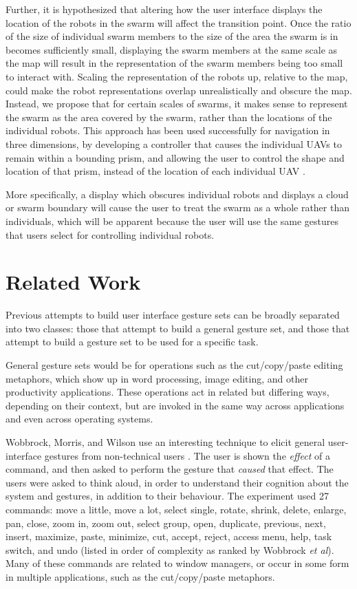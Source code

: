 \documentclass[]{article}
\begin{document}
Further, it is hypothesized that altering how the user interface displays the location of the robots in the swarm will affect the transition point.
Once the ratio of the size of individual swarm members to the size of the area the swarm is in becomes sufficiently small, displaying the swarm members at the same scale as the map will result in the representation of the swarm members being too small to interact with. 
Scaling the representation of the robots up, relative to the map, could make the robot representations overlap unrealistically and obscure the map. 
Instead, we propose that for certain scales of swarms, it makes sense to represent the swarm as the area covered by the swarm, rather than the locations of the individual robots.
This approach has been used successfully for navigation in three dimensions, by developing a controller that causes the individual UAVs to remain within a bounding prism, and allowing the user to control the shape and location of that prism, instead of the location of each individual UAV \cite{ayanian2014controlling}.
 
More specifically, a display which obscures individual robots and displays a cloud or swarm boundary will cause the user to treat the swarm as a whole rather than individuals, which will be apparent because the user will use the same gestures that users select for controlling individual robots. 

\section{Related Work}

Previous attempts to build user interface gesture sets can be broadly separated into two classes: those that attempt to build a general gesture set, and those that attempt to build a gesture set to be used for a specific task. 

General gesture sets would be for operations such as the cut/copy/paste editing metaphors, which show up in word processing, image editing, and other productivity applications. 
These operations act in related but differing ways, depending on their context, but are invoked in the same way across applications and even across operating systems. 

Wobbrock, Morris, and Wilson use an interesting technique to elicit general user-interface gestures from non-technical users \cite{wobbrock2009user}.
The user is shown the \textit{effect} of a command, and then asked to perform the gesture that \textit{caused} that effect. 
The users were asked to think aloud, in order to understand their cognition about the system and gestures, in addition to their behaviour. 
The experiment used 27 commands: move a little, move a lot, select single, rotate, shrink, delete, enlarge, pan, close, zoom in, zoom out, select group, open, duplicate, previous, next, insert, maximize, paste, minimize, cut, accept, reject, access menu, help, task switch, and undo (listed in order of complexity as ranked by Wobbrock \textit{et al}).
Many of these commands are related to window managers, or occur in some form in multiple applications, such as the cut/copy/paste metaphors.
\end{document}
